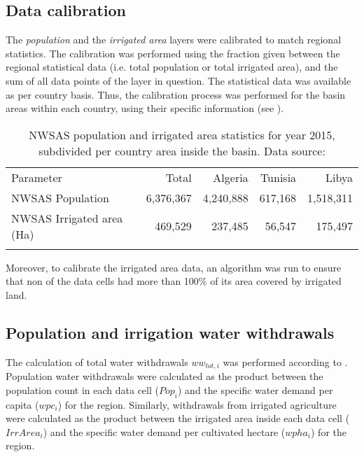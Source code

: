 \subsection{Data calibration}
The \textit{population} and the \textit{irrigated area} layers were calibrated to match regional statistics. The calibration was performed using the fraction given between the regional statistical data (i.e. total population or total irrigated area), and the sum of all data points of the layer in question. The statistical data was available as per country basis. Thus, the calibration process was performed for the basin areas within each country, using their specific information (see ).

\begin{table}[!ht]
	\caption{\label{tbl:regionalstats}NWSAS population and irrigated area statistics for year 2015, subdivided per country area inside the basin. Data source: \cite{BetterValorizationIrrigation2015}}
	\begin{indented}
	\item[]\begin{tabular}{@{}l*{4}{r}}
		\br
		Parameter & Total & Algeria & Tunisia & Libya\\
		\mr
		NWSAS Population & 6,376,367 & 4,240,888 & 617,168 & 1,518,311\\
		NWSAS Irrigated area (Ha) & 469,529 & 237,485 & 56,547 & 175,497\\
		\br
	\end{tabular}
	\end{indented}
\end{table}

Moreover, to calibrate the irrigated area data, an algorithm was run to ensure that non of the data cells had more than 100\% of its area covered by irrigated land.
 
\subsection{Population and irrigation water withdrawals}
The calculation of total water withdrawals $ww_{tot,i}$ was performed according to . Population water withdrawals were calculated as the product between the population count in each data cell ($Pop_{i}$) and the specific water demand per capita ($wpc_{i}$) for the region. Similarly, withdrawals from irrigated agriculture were calculated as the product between the irrigated area inside each data cell ($IrrArea_{i}$) and the specific water demand per cultivated hectare ($wpha_{i}$) for the region.

